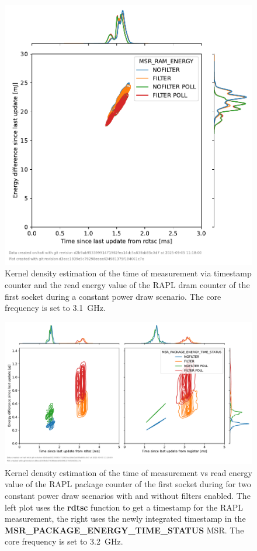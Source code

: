 \begin{figure}[]
    \centering
    \includegraphics[width=0.54\columnwidth]{fig/rapl-update-intervals/MSR_RAM_ENERGY_3100000.pdf}
    \caption{Kernel density estimation of the time of measurement via timestamp counter and the read energy value of the RAPL dram counter of the first socket during a constant power draw scenario.
    The core frequency is set to \SI{3.1}{\GHz}.}
\end{figure}

\clearpage
\begin{figure}[]
    \centering
    \includegraphics[width=\columnwidth]{fig/rapl-update-intervals/MSR_PACKAGE_ENERGY_TIME_STATUS_3200000.pdf}
    \caption{Kernel density estimation of the time of measurement vs read energy value of the RAPL package counter of the first socket during for two constant power draw scenarios with and without filters enabled.
    The left plot uses the \textbf{rdtsc} function to get a timestamp for the RAPL measurement, the right uses the newly integrated timestamp in the \textbf{MSR\_PACKAGE\_ENERGY\_TIME\_STATUS} MSR.
    The core frequency is set to \SI{3.2}{\GHz}.}
\end{figure}

